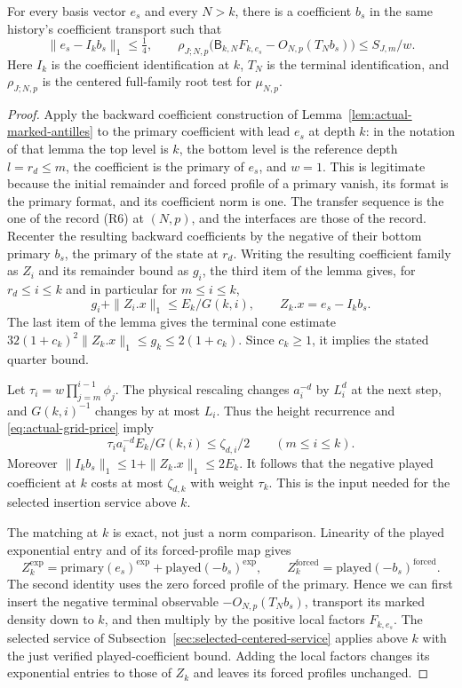 \begin{lemma}\label{lem:actual-grid-basis}
For every basis vector $e_s$ and every $N>k$, there is a coefficient $b_s$
in the same history's coefficient transport such that
\[
 \|e_s-I_kb_s\|_1\leq\tfrac14,
 \qquad
 \rho_{J;N,p}\bigl(\mathsf B_{k,N}F_{k,e_s}
                    -O_{N,p}(T_Nb_s)\bigr)\leq S_{J,m}/w.
\]
Here $I_k$ is the coefficient identification at $k$, $T_N$ is the terminal
identification, and $\rho_{J;N,p}$ is the centered full-family root test
for $\mu_{N,p}$.
\end{lemma}
\begin{proof}
Apply the backward coefficient construction of
Lemma~\ref{lem:actual-marked-antilles} to the primary coefficient with
lead $e_s$ at depth $k$: in the notation of that lemma the top level is
$k$, the bottom level is the reference depth $l=r_d\leq m$, the
coefficient is the primary of $e_s$, and $w=1$. This is legitimate because
the initial remainder and forced profile of a primary vanish, its format
is the primary format, and its coefficient norm is one. The transfer sequence is the
one of the record (R6) at $(N,p)$, and the interfaces are those of the record.
Recenter the resulting backward coefficients by the negative of their
bottom primary $b_s$, the primary of the state at $r_d$.
Writing the resulting coefficient family as $Z_i$ and its remainder bound as $g_i$,
the third item of the lemma gives, for $r_d\leq i\leq k$ and in
particular for $m\leq i\leq k$,
\[
 g_i+\|Z_i.x\|_1\leq E_k/G(k,i),\qquad
 Z_k.x=e_s-I_kb_s.
\]
The last item of the lemma gives the terminal cone estimate
$32(1+c_k)^2\|Z_k.x\|_1\leq g_k\leq2(1+c_k)$.
Since $c_k\geq1$, it implies the stated quarter bound.

Let $\tau_i=w\prod_{j=m}^{i-1}\phi_j$. The physical rescaling changes
$a_i^{-d}$ by $L_i^d$ at the next step, and $G(k,i)^{-1}$ changes by at
most $L_i$. Thus the height recurrence and
\eqref{eq:actual-grid-price} imply
\[
 \tau_i a_i^{-d}E_k/G(k,i)\leq\zeta_{d,i}/2
       \qquad(m\leq i\leq k).
\]
Moreover $\|I_kb_s\|_1\leq1+\|Z_k.x\|_1\leq2E_k$.
It follows that the negative played coefficient at $k$ costs at most
$\zeta_{d,k}$ with weight $\tau_k$. This is the input needed for the
selected insertion service above $k$.

The matching at $k$ is exact, not just a norm comparison. Linearity of
the played exponential entry and of its forced-profile map gives
\[
 Z_k^{\mathrm{exp}}=\mathrm{primary}(e_s)^{\mathrm{exp}}
                       +\mathrm{played}(-b_s)^{\mathrm{exp}},\qquad
 Z_k^{\mathrm{forced}}=\mathrm{played}(-b_s)^{\mathrm{forced}}.
\]
The second identity uses the zero forced profile of the primary. Hence we
can first insert the negative terminal observable
$-O_{N,p}(T_Nb_s)$, transport its marked density down to $k$, and then
multiply by the positive local factors $F_{k,e_s}$. The selected service
of Subsection~\ref{sec:selected-centered-service} applies above $k$ with
the just verified played-coefficient bound. Adding the local factors
changes its exponential entries to those of $Z_k$ and leaves its forced
profiles unchanged.


\end{proof}
